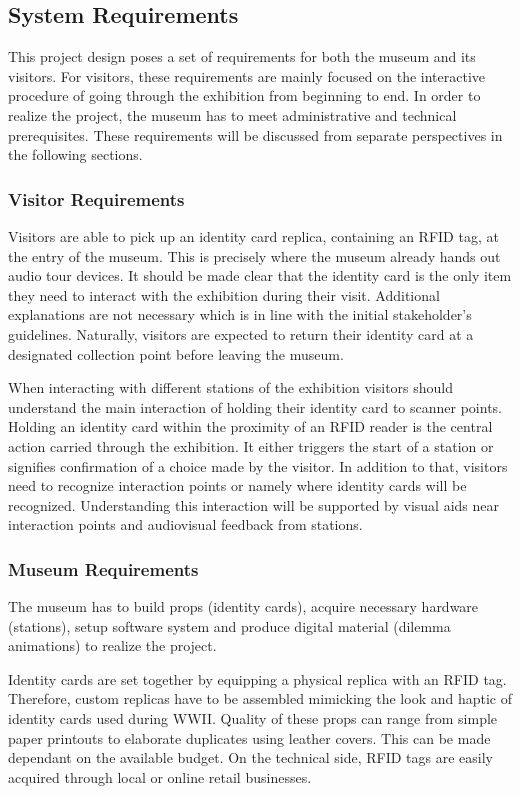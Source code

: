 
\subsection{System Requirements}
This project design poses a set of requirements for both the museum and its visitors.
For visitors, these requirements are mainly focused on the interactive procedure of going through the exhibition from beginning to end.
In order to realize the project, the museum has to meet administrative and technical prerequisites.
These requirements will be discussed from separate perspectives in the following sections.


\subsubsection{Visitor Requirements}
Visitors are able to pick up an identity card replica, containing an RFID tag, at the entry of the museum.
This is precisely where the museum already hands out audio tour devices.
It should be made clear that the identity card is the only item they need to interact with the exhibition during their visit.
Additional explanations are not necessary which is in line with the initial stakeholder's guidelines.
Naturally, visitors are expected to return their identity card at a designated collection point before leaving the museum.

When interacting with different stations of the exhibition visitors should understand the main interaction of holding their identity card to scanner points.
Holding an identity card within the proximity of an RFID reader is the central action carried through the exhibition.
It either triggers the start of a station or signifies confirmation of a choice made by the visitor.
In addition to that, visitors need to recognize interaction points or namely where identity cards will be recognized.
Understanding this interaction will be supported by visual aids near interaction points and audiovisual feedback from stations.


\subsubsection{Museum Requirements}
The museum has to build props (identity cards), acquire necessary hardware (stations), setup software system and produce digital material (dilemma animations) to realize the project.

Identity cards are set together by equipping a physical replica with an RFID tag.
Therefore, custom replicas have to be assembled mimicking the look and haptic of identity cards used during WWII.
Quality of these props can range from simple paper printouts to elaborate duplicates using leather covers.
This can be made dependant on the available budget.
On the technical side, RFID tags are easily acquired through local or online retail businesses.

